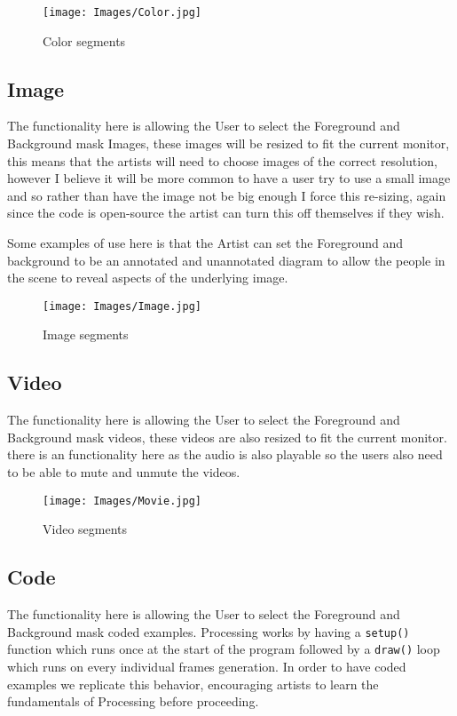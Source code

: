 \documentclass[a4paper]{report}
\begin{document}
\begin{figure}[!ht]
\centering
\texttt{[image: Images/Color.jpg]}
\caption{\label{fig:Doughnut} Color segments}
\end{figure}
\clearpage

\subsection{Image}
The functionality here is allowing the User to select the Foreground and Background mask Images, these images will be resized to fit the current monitor, this means that the artists will need to choose images of the correct resolution, however I believe it will be more common to have a user try to use a small image and so rather than have the image not be big enough I force this re-sizing, again since the code is open-source the artist can turn this off themselves if they wish.

Some examples of use here is that the Artist can set the Foreground and background to be an annotated and unannotated diagram to allow the people in the scene to reveal aspects of the underlying image.

\begin{figure}[!ht]
\centering
\texttt{[image: Images/Image.jpg]}
\caption{\label{fig:Doughnut} Image segments}
\end{figure}

\subsection{Video}
The functionality here is allowing the User to select the Foreground and Background mask videos, these videos are also resized to fit the current monitor. there is an functionality here as the audio is also playable so the users also need to be able to mute and unmute the videos.

\begin{figure}[!ht]
\centering
\texttt{[image: Images/Movie.jpg]}
\caption{\label{fig:Doughnut} Video segments}
\end{figure}
\clearpage

\subsection{Code}
The functionality here is allowing the User to select the Foreground and Background mask coded examples. Processing \cite{PROCESSING} works by having a 
\verb|setup()| function which runs once at the start of the program followed by a \verb|draw()| loop which runs on every individual frames generation. In order to have coded examples we replicate this behavior, encouraging artists to learn the fundamentals of Processing before proceeding.
\end{document}
